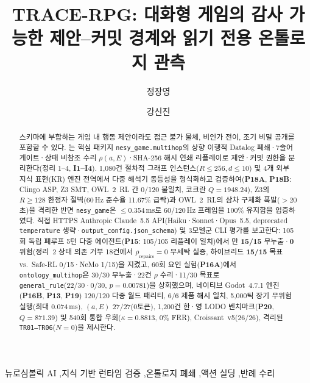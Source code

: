 \documentclass[final,5p,times,twocolumn]{elsarticle}
\begin{document}
\begin{frontmatter}

\title{TRACE-RPG: 대화형 게임의 감사 가능한 제안--커밋 경계와 읽기 전용 온톨로지 관측}

\author[1]{정장영}
\author[2]{강신진}

\begin{abstract}
스키마에 부합하는 게임 내 행동 제안이라도 접근 불가 물체, 비인가 전이, 조기 비밀 공개를 포함할 수 있다. \system{}는 핵심 패키지 \texttt{nesy\_game.multihop}의 상향 이행적 Datalog 폐쇄·7술어 게이트·상태 비참조 수리 $\rho(a,E)$·SHA-256 해시 연쇄 리플레이로 제안·커밋 권한을 분리한다(정리 1--4, \textbf{I1--I4}). 1,080건 절차적 그래프 인스턴스($R\le 256, d\le 10$) 및 4개 외부 지식 표현(KR) 엔진 전역에서 다중 해석기 동등성을 형식화하고 검증하여(\textbf{P18A}, \textbf{P18B}: Clingo ASP, Z3 SMT, OWL~2~RL 간 0/120 불일치, 코크란 $Q{=}1948.24$), Z3의 $R\ge 128$ 한정자 절벽(60\,Hz 준수율 11.67\% 급락)과 OWL~2~RL의 삼차 구체화 폭발($>$20초)을 격리한 반면 \texttt{nesy\_game}은 $\le$0.354\,ms로 60/120\,Hz 프레임을 100\% 유지함을 입증하였다. 직접 HTTPS Anthropic Claude~5.5 API(Haiku·Sonnet·Opus~5.5, deprecated \texttt{temperature} 생략·\texttt{output\_config.json\_schema}) 및 3모델군 CLI 평가를 보고한다: 105회 독립 폐루프 5턴 다중 에이전트(\textbf{P15}: 105/105 리플레이 일치)에서 \system{}만 \textbf{15/15} 무누출·\textbf{0} 위험(정리~2 상태 의존 거부 18건에서 $\rho_{\mathrm{repairs}}{=}0$ 무세탁 실증, 하이브리드 \textbf{15/15} 목표 vs.\ Safe-RL 0/15·NeMo 1/15)을 지켰고, 60회 요인 실험(\textbf{P16A})에서 \texttt{ontology\_multihop}은 30/30 무누출·22건 $\rho$ 수리·11/30 목표로 \texttt{general\_rule}(22/30·0/30, $p{=}0.00781$)을 상회했으며, 네이티브 Godot~4.7.1 엔진(\textbf{P16B}, \textbf{P13}, \textbf{P19}) 120/120 다중 월드 패리티, 6/6 제품 해시 일치, 5,000틱 장기 무위험 실행(최대 0.074\,ms), $(a,E)$ 27/27(0토큰), 1,200건 한·영 LODO 벤치마크(\textbf{P20}, $Q{=}871.39$) 및 540회 통합 우회($\kappa{=}0.8813$, 0\% FRR), Croissant~v5(26/26), 격리된 \texttt{TR01--TR06}($N{=}0$)을 제시한다.
\end{abstract}

\begin{keyword}
뉴로심볼릭 AI \sep 지식 기반 런타임 검증 \sep 온톨로지 폐쇄 \sep 액션 실딩 \sep 반례 수리
\end{keyword}

\end{frontmatter}
\end{document}
